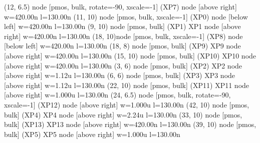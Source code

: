 \begin{circuitikz}[american]
	(12, 6.5) node [pmos, bulk, rotate=-90, xscale=-1] (XP7) {} node [above right] {\tiny {w=420.00n l=130.00n}}
	(11, 10) node [pmos, bulk, xscale=-1] (XP0) {} node [below left] {\tiny {w=420.00n l=130.00n}}
	(9, 10) node [pmos, bulk] (XP1) {XP1} node [above right] {\tiny {w=420.00n l=130.00n}}
	(18, 10)node [pmos, bulk, xscale=-1] (XP8) {} node [below left] {\tiny {w=420.00n l=130.00n}}
	(18, 8) node [pmos, bulk] (XP9) {XP9} node [above right] {\tiny {w=420.00n l=130.00n}}
	(15, 10) node [pmos, bulk] (XP10) {XP10} node [above right] {\tiny {w=420.00n l=130.00n}}
	(3, 6) node [pmos, bulk] (XP2) {XP2} node [above right] {\tiny {w=1.12u l=130.00n}}
	(6, 6) node [pmos, bulk] (XP3) {XP3} node [above right] {\tiny {w=1.12u l=130.00n}}
	(22, 10) node [pmos, bulk] (XP11) {XP11} node [above right] {\tiny {w=1.000u l=130.00n}}
	(24, 6.5) node [pmos, bulk, rotate=-90, xscale=-1] (XP12) {} node [above right] {\tiny {w=1.000u l=130.00n}}
	(42, 10) node [pmos, bulk] (XP4) {XP4} node [above right] {\tiny {w=2.24u l=130.00n}}
	(33, 10) node [pmos, bulk] (XP13) {XP13} node [above right] {\tiny {w=420.00n l=130.00n}}
	(39, 10) node [pmos, bulk] (XP5) {XP5} node [above right] {\tiny {w=1.000u l=130.00n}}



\end{circuitikz}
